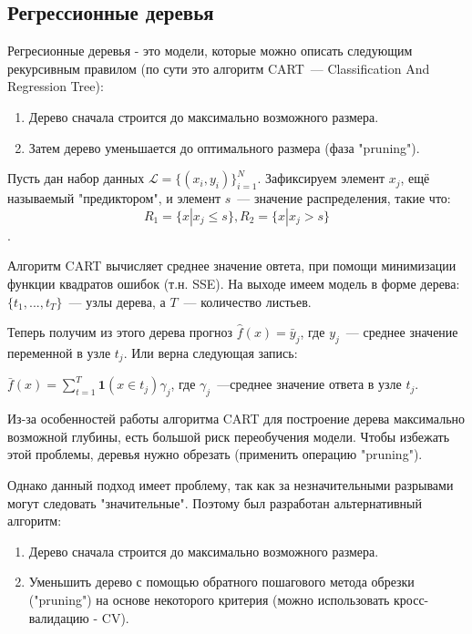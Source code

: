 \subsection*{Регрессионные деревья}
 Регресионные деревья - это модели, которые можно описать следующим рекурсивным правилом (по сути это алгоритм CART~--- Classification And Regression Tree):
\begin{enumerate}
    \item Дерево сначала строится до максимально возможного размера.
    \item Затем дерево уменьшается до оптимального размера (фаза "pruning").
\end{enumerate}

Пусть дан набор данных $\mathcal{L} = \{(x_i, y_i)\}_{i = 1}^N$. Зафиксируем элемент $x_j$, ещё называемый "предиктором", и элемент $s$~--- значение распределения, такие что:
$$R_1 = \{x | x_j \leq s\}, R_2=\{x | x_j > s\}$$.

Алгоритм CART вычисляет среднее значение овтета, при помощи минимизации функции квадратов ошибок (т.н. SSE). На выходе имеем модель в форме дерева: $\{t_1, ...,t_T\}$~--- узлы дерева, а $T$~--- количество листьев. 

Теперь получим из этого дерева прогноз $\hat{f}(x)=\bar{y}_j$, где $y_j$~--- среднее значение переменной в узле $t_j$. Или верна следующая запись:

\begin{center}   
$\bar{f}(x) = \sum_{t=1}^T \mathbf{1}(x \in t_j)\gamma_j$, где $\gamma_j$~---среднее значение ответа в узле $t_j$.
\end{center}

Из-за особенностей работы алгоритма CART для построение дерева максимально возможной глубины, есть большой риск переобучения модели. Чтобы избежать этой проблемы, деревья нужно обрезать (применить операцию "pruning").

Однако данный подход имеет проблему, так как за незначительными разрывами могут следовать "значительные". Поэтому был разработан альтернативный алгоритм:
\begin{enumerate}
    \item Дерево сначала строится до максимально возможного размера.
    \item Уменьшить дерево с помощью обратного пошагового метода обрезки ("pruning") на основе некоторого критерия (можно использовать кросс-валидацию - CV).
\end{enumerate}

